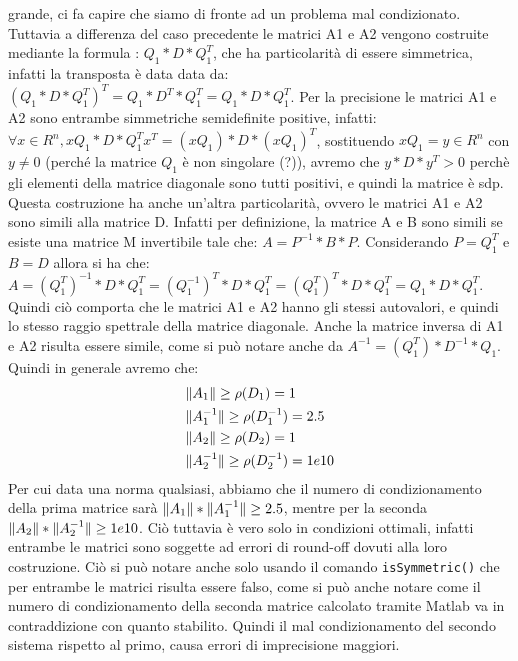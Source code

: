 \documentclass[12pt]{article}
\begin{document}
\begin{enumerate}
    grande, ci fa capire che siamo di fronte ad un problema mal condizionato. \\
    Tuttavia a differenza del caso precedente le matrici A1 e A2 vengono costruite mediante la formula : \(Q_1 * D * Q_1^{T}\), che ha particolarità di essere simmetrica,
    infatti la transposta è data data da: \((Q_1 * D * Q_1^{T})^{T}=Q_1*D^{T}*Q_1^{T}=Q_1 * D * Q_1^{T}\). 
    Per la precisione le matrici A1 e A2 sono entrambe simmetriche semidefinite positive, infatti:
    \(\forall x \in R^{n}, xQ_1 * D * Q_1^{T}x^{T} = (xQ_1) * D * (xQ_1)^{T}\), sostituendo \(xQ_1=y \in R^{n}\) con \(y \ne 0\) 
    (perché la matrice \(Q_1\) è non singolare (?)), avremo che \(y*D*y^{T}>0\) perchè gli elementi della matrice diagonale sono tutti positivi, e quindi la matrice è sdp.
    Questa costruzione ha anche un'altra particolarità, ovvero le matrici A1 e A2 sono simili alla matrice D. Infatti per definizione,
    la matrice A e B sono simili se esiste una matrice M invertibile tale che: \(A=P^{-1}*B*P\). Considerando \(P=Q_1^{T}\) e \(B=D\) 
    allora si ha che: \(A=(Q_1^{T})^{-1}*D*Q_1^{T} = (Q_1^{-1})^{T}*D*Q_1^{T} = (Q_1^{T})^{T}*D*Q_1^{T} = Q_1*D*Q_1^{T}\). 
    Quindi ciò comporta che le matrici A1 e A2 hanno gli stessi autovalori, e quindi lo stesso raggio spettrale della matrice diagonale.
    Anche la matrice inversa di A1 e A2 risulta essere simile, come si può notare anche da \(A^{-1}=(Q_1^{T})*D^{-1}*Q_1\).
    Quindi in generale avremo che: 
    \begin{equation*}
        \begin{aligned}
            & \Arrowvert A_1 \Arrowvert \ge \rho(D_1) = 1  \\
            & \Arrowvert A_1^{-1} \Arrowvert \ge \rho(D_1^{-1}) = 2.5 \\
            & \Arrowvert A_2 \Arrowvert \ge \rho(D_2) = 1  \\
            & \Arrowvert A_2^{-1} \Arrowvert \ge \rho(D_2^{-1}) = 1e10  \\
        \end{aligned}
    \end{equation*}
    Per cui data una norma qualsiasi, abbiamo che il numero di condizionamento della prima matrice sarà 
    \(\Arrowvert A_1 \Arrowvert * \Arrowvert A_1^{-1} \Arrowvert \ge 2.5\), mentre per la seconda 
    \(\Arrowvert A_2 \Arrowvert * \Arrowvert A_2^{-1} \Arrowvert \ge 1e10\). 
    Ciò tuttavia è vero solo in condizioni ottimali, infatti entrambe le matrici 
    sono soggette ad errori di round-off dovuti alla loro costruzione.
    Ciò si può notare anche solo usando il comando \texttt{isSymmetric()}
    che per entrambe le matrici risulta essere falso, come si può anche notare come il 
    numero di condizionamento della seconda matrice calcolato 
    tramite Matlab va in contraddizione con quanto stabilito.
    Quindi il mal condizionamento del secondo sistema rispetto al primo, causa errori di imprecisione maggiori.

\end{enumerate}
\end{document}
